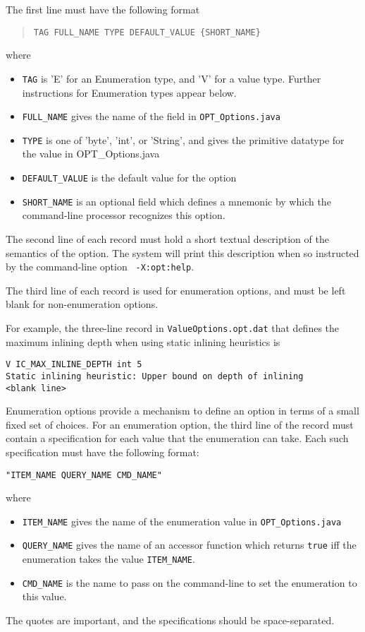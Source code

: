 The first line must have the following format
\begin{quote}
\begin{verbatim}
TAG FULL_NAME TYPE DEFAULT_VALUE {SHORT_NAME}
\end{verbatim}
\end{quote}
where
\begin{itemize}
\item {\tt TAG} is 'E' for an Enumeration type, and 'V' for a value type.  Further instructions for Enumeration types appear below.
\item {\tt FULL\_NAME} gives the name of the field in {\tt OPT\_Options.java}
\item {\tt TYPE} is one of 'byte', 'int', or 'String', and gives the primitive datatype for the value in OPT\_Options.java
\item {\tt DEFAULT\_VALUE} is the default value for the option
\item {\tt SHORT\_NAME} is an optional field which defines a mnemonic by which the command-line processor recognizes this option.
\end{itemize}

The second line of each record must hold a short textual description
of the semantics of the option.  The system will print this
description when so instructed by the command-line option {\tt
-X:opt:help}.

The third line of each record is used for enumeration options, and must
be left blank for non-enumeration options.

For example, the three-line record in {\tt ValueOptions.opt.dat}
that defines the maximum inlining depth when using static inlining
heuristics is
\begin{verbatim}
V IC_MAX_INLINE_DEPTH int 5
Static inlining heuristic: Upper bound on depth of inlining
<blank line>
\end{verbatim}

Enumeration options provide a mechanism to define an option in terms of 
a small fixed set of choices.  For an enumeration option, the third line
of the record must contain a specification for each value that the
enumeration can take.  Each such specification must have the following
format:
\begin{verbatim}
"ITEM_NAME QUERY_NAME CMD_NAME"
\end{verbatim}
where
\begin{itemize}
\item {\tt ITEM\_NAME} gives the name of the enumeration value in {\tt OPT\_Options.java}
\item {\tt QUERY\_NAME} gives the name of an accessor function which returns {\tt true} iff the enumeration takes the value {\tt ITEM\_NAME}.
\item {\tt CMD\_NAME} is the name to pass on the command-line to set the enumeration to this value.
\end{itemize}
The quotes are important, and the specifications should be
space-separated.

